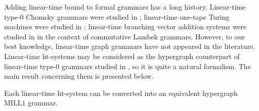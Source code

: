\documentclass[a4paper,UKenglish,cleveref, autoref, thm-restate,pdfa]{lipics-v2021}
\newcommand{\MILLFO}{\mathrm{MILL}1}
\begin{document}
Adding linear-time bound to formal grammars has a long history. Linear-time type-0 Chomsky grammars were studied in \cite{Book71,Gladkii64}; linear-time one-tape Turing machines were studied in \cite{Tadaki10}; linear-time branching vector addition systems were studied in \cite{Pshenitsyn23} in the context of commutative Lambek grammars. However, to our best knowledge, linear-time graph grammars have not appeared in the literature. Linear-time ht-systems may be considered as the hypergraph counterpart of linear-time type-0 grammars studied in \cite{Book71,Gladkii64}, so it is quite a natural formalism. The main result concerning them is presented below.
\begin{theorem}\label{theorem:MILL1G>LTHTS}
	Each linear-time ht-system can be converted into an equivalent hypergraph $\MILLFO$ grammar.
\end{theorem}
\end{document}

